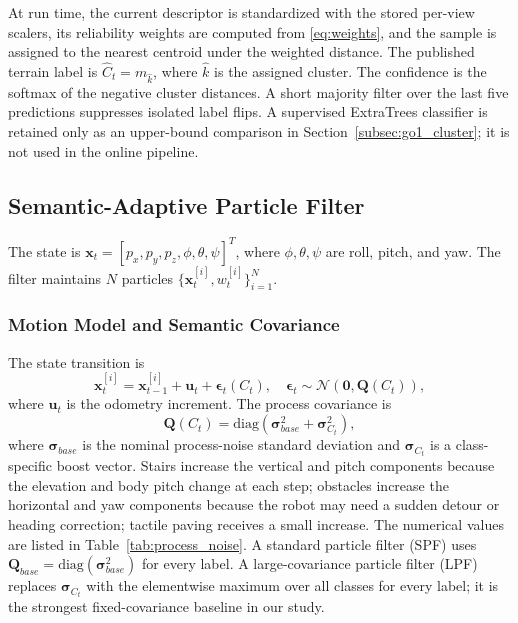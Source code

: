 \documentclass[final,3p,times]{elsarticle}
\begin{document}
At run time, the current descriptor is standardized with the stored per-view scalers, its reliability weights are computed from \eqref{eq:weights}, and the sample is assigned to the nearest centroid under the weighted distance. The published terrain label is $\hat{C}_t=m_{\hat{k}}$, where $\hat{k}$ is the assigned cluster. The confidence is the softmax of the negative cluster distances. A short majority filter over the last five predictions suppresses isolated label flips. A supervised ExtraTrees classifier is retained only as an upper-bound comparison in Section~\ref{subsec:go1_cluster}; it is not used in the online pipeline.

\subsection{Semantic-Adaptive Particle Filter}
\label{subsec:sapf}
The state is $\mathbf{x}_t = [p_x,p_y,p_z,\phi,\theta,\psi]^T$, where $\phi,\theta,\psi$ are roll, pitch, and yaw. The filter maintains $N$ particles $\{\mathbf{x}^{[i]}_t,w^{[i]}_t\}_{i=1}^{N}$.

\subsubsection{Motion Model and Semantic Covariance}
The state transition is
\begin{equation}
    \mathbf{x}^{[i]}_t = \mathbf{x}^{[i]}_{t-1} + \mathbf{u}_t + \bm{\epsilon}_t(C_t),
    \quad \bm{\epsilon}_t \sim \mathcal{N}(\mathbf{0},\mathbf{Q}(C_t)),
    \label{eq:motion}
\end{equation}
where $\mathbf{u}_t$ is the odometry increment. The process covariance is
\begin{equation}
    \mathbf{Q}(C_t) = \mathrm{diag}\!\left(\bm{\sigma}_{base}^{2} + \bm{\sigma}_{C_t}^{2}\right),
    \label{eq:qct}
\end{equation}
where $\bm{\sigma}_{base}$ is the nominal process-noise standard deviation and $\bm{\sigma}_{C_t}$ is a class-specific boost vector. Stairs increase the vertical and pitch components because the elevation and body pitch change at each step; obstacles increase the horizontal and yaw components because the robot may need a sudden detour or heading correction; tactile paving receives a small increase. The numerical values are listed in Table~\ref{tab:process_noise}. A standard particle filter (SPF) uses $\mathbf{Q}_{base}=\mathrm{diag}(\bm{\sigma}_{base}^{2})$ for every label. A large-covariance particle filter (LPF) replaces $\bm{\sigma}_{C_t}$ with the elementwise maximum over all classes for every label; it is the strongest fixed-covariance baseline in our study.
\end{document}
